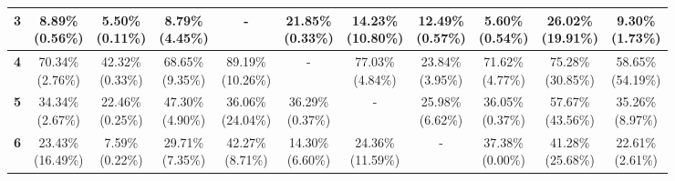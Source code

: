 \documentclass{report}
\begin{document}
\begin{center}
{\begin{tabular}{|c|c|c|c|c|c|c|c|c|c|c|}
  \textbf{3} & \makecell{8.89\% \\ (0.56\%)} & \makecell{5.50\% \\ (0.11\%)} & \makecell{8.79\% \\ (4.45\%)} & - & \makecell{21.85\% \\ (0.33\%)} & \makecell{14.23\% \\ (10.80\%)} & \makecell{12.49\% \\ (0.57\%)} & \makecell{5.60\% \\ (0.54\%)} & \makecell{26.02\% \\ (19.91\%)} & \makecell{9.30\% \\ (1.73\%)} \\ \hline
  \textbf{4} & \makecell{70.34\% \\ (2.76\%)} & \makecell{42.32\% \\ (0.33\%)} & \makecell{68.65\% \\ (9.35\%)} & \makecell{89.19\% \\ (10.26\%)} & - & \makecell{77.03\% \\ (4.84\%)} & \makecell{23.84\% \\ (3.95\%)} & \makecell{71.62\% \\ (4.77\%)} & \makecell{75.28\% \\ (30.85\%)} & \makecell{58.65\% \\ (54.19\%)} \\ \hline
  \textbf{5} & \makecell{34.34\% \\ (2.67\%)} & \makecell{22.46\% \\ (0.25\%)} & \makecell{47.30\% \\ (4.90\%)} & \makecell{36.06\% \\ (24.04\%)} & \makecell{36.29\% \\ (0.37\%)} & - & \makecell{25.98\% \\ (6.62\%)} & \makecell{36.05\% \\ (0.37\%)} & \makecell{57.67\% \\ (43.56\%)} & \makecell{35.26\% \\ (8.97\%)} \\ \hline
  \textbf{6} & \makecell{23.43\% \\ (16.49\%)} & \makecell{7.59\% \\ (0.22\%)} & \makecell{29.71\% \\ (7.35\%)} & \makecell{42.27\% \\ (8.71\%)} & \makecell{14.30\% \\ (6.60\%)} & \makecell{24.36\% \\ (11.59\%)} & - & \makecell{37.38\% \\ (0.00\%)} & \makecell{41.28\% \\ (25.68\%)} & \makecell{22.61\% \\ (2.61\%)} \\ \hline

\end{tabular}}
\end{center}
\end{document}
